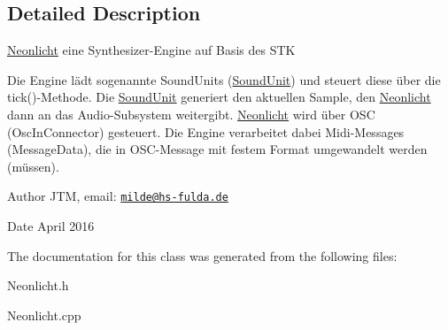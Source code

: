\subsection{Detailed Description}
\hyperlink{classNeonlicht}{Neonlicht} eine Synthesizer-\/\+Engine auf Basis des S\+TK

Die Engine lädt sogenannte Sound\+Units (\hyperlink{classSoundUnit}{Sound\+Unit}) und steuert diese über die tick()-\/\+Methode. Die \hyperlink{classSoundUnit}{Sound\+Unit} generiert den aktuellen Sample, den \hyperlink{classNeonlicht}{Neonlicht} dann an das Audio-\/\+Subsystem weitergibt. \hyperlink{classNeonlicht}{Neonlicht} wird über O\+SC (Osc\+In\+Connector) gesteuert. Die Engine verarbeitet dabei Midi-\/\+Messages (Message\+Data), die in O\+S\+C-\/\+Message mit festem Format umgewandelt werden (müssen).

\begin{DoxyAuthor}{Author}
J\+TM,  email\+: \href{mailto:milde@hs-fulda.de}{\tt milde@hs-\/fulda.\+de} 
\end{DoxyAuthor}
\begin{DoxyDate}{Date}
April 2016 
\end{DoxyDate}


The documentation for this class was generated from the following files\+:\begin{DoxyCompactItemize}
\item 
Neonlicht.\+h\item 
Neonlicht.\+cpp\end{DoxyCompactItemize}
